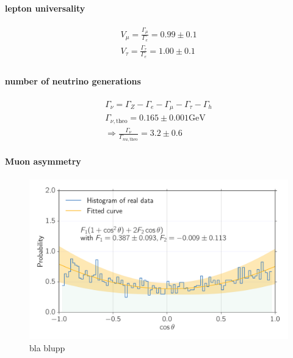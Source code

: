 \paragraph{lepton universality}
\label{par:lepton_universality}


\label{ssub:leptonun}
\begin{align}
    V_\mu = \frac{\Gamma_\mu}{\Gamma_e} = 0.99 \pm 0.1 \\ 
    V_\tau = \frac{\Gamma_\tau}{\Gamma_e} = 1.00 \pm 0.1 \\
\end{align}

\paragraph{number of neutrino generations}
\label{par:number_of_neutrino_generations}
\begin{align*}
    \label{eq:gen}
    \Gamma_\nu = \Gamma_Z - \Gamma_e - \Gamma_\mu - \Gamma_\tau - \Gamma_h \\ 
    \Gamma_{\nu, \mathrm{theo}} = 0.165 \pm 0.001 \mathrm{GeV} \\ 
    \Rightarrow \frac{\Gamma_\nu}{\Gamma_{nu, \mathrm{theo}}}  = 3.2 \pm 0.6
\end{align*}

\paragraph{Muon asymmetry}
\label{par:assymetry}

\begin{figure}[htpb]
    \centering
    \includegraphics[width=1.0\linewidth]{figures/assymetry}
    \caption{bla blupp}
    \label{fig:assymetry}
\end{figure}

